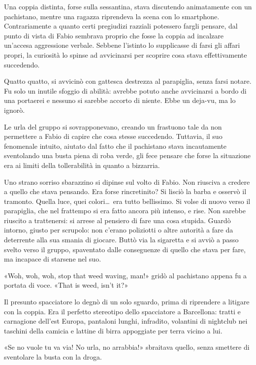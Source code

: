 Una coppia distinta, forse sulla sessantina, stava discutendo animatamente con un pachistano, mentre una ragazza riprendeva la scena con lo smartphone. Contrariamente a quanto certi pregiudizi razziali potessero fargli pensare, dal punto di vista di Fabio sembrava proprio che fosse la coppia ad incalzare un'accesa aggressione verbale. Sebbene l'istinto lo supplicasse di farsi gli affari propri, la curiosità lo spinse ad avvicinarsi per scoprire cosa stava effettivamente succedendo.

Quatto quatto, si avvicinò con gattesca destrezza al parapiglia, senza farsi notare. Fu solo un inutile sfoggio di abilità: avrebbe potuto anche avvicinarsi a bordo di una portaerei e nessuno si sarebbe accorto di niente. Ebbe un deja-vu, ma lo ignorò.

Le urla del gruppo si sovrapponevano, creando un frastuono tale da non permettere a Fabio di capire che cosa stesse succedendo. Tuttavia, il suo fenomenale intuito, aiutato dal fatto che il pachistano stava incautamente sventolando una busta piena di roba verde, gli fece pensare che forse la situazione era ai limiti della tollerabilità in quanto a bizzarria.

Uno strano sorriso sbarazzino si dipinse sul volto di Fabio. Non riusciva a credere a quello che stava pensando. Era forse rincretinito? Si lisciò la barba e osservò il tramonto. Quella luce, quei colori\ldots\ era tutto bellissimo. Si volse di nuovo verso il parapiglia, che nel frattempo si era fatto ancora più intenso, e rise. Non sarebbe riuscito a trattenersi: si arrese al pensiero di fare una cosa stupida. Guardò intorno, giusto per scrupolo: non c'erano poliziotti o altre autorità a fare da deterrente alla sua smania di giocare. Buttò via la sigaretta e si avviò a passo svelto verso il gruppo, spaventato dalle conseguenze di quello che stava per fare, ma incapace di starsene nel suo.

«Woh, woh, woh, stop that weed waving, man!» gridò al pachistano appena fu a portata di voce. «That is weed, isn't it?»

Il presunto spacciatore lo degnò di un solo sguardo, prima di riprendere a litigare con la coppia. Era il perfetto stereotipo dello spacciatore a Barcellona: tratti e carnagione dell'est Europa, pantaloni lunghi, infradito, volantini di nightclub nei taschini della camicia e lattine di birra appoggiate per terra vicino a lui.

«Se no vuole tu va via! No urla, no arrabbia!» sbraitava quello, senza smettere di sventolare la busta con la droga.

